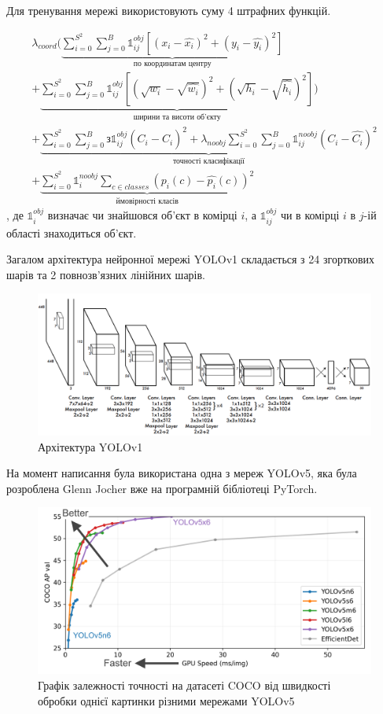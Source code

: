 Для тренування мережі використовують суму 4 штрафних функцій.

\begin{multline}
    \lambda_{coord}(
    \underbrace{ \sum_{i=0}^{S^2} \sum_{j=0}^{B}
    \mathbb{1}_{ij}^{obj} [(x_i - \widehat{x_i})^2 + (y_i - \widehat{y_i})^2]
    }_\textrm{по координатам центру}\\
    +
    \underbrace{
    \sum_{i=0}^{S^2} \sum_{j=0}^{B}
    \mathbb{1}_{ij}^{obj} [(\sqrt{w_i} - \sqrt{\widehat{w_i}})^2 + (\sqrt{h_i} - \sqrt{\widehat{h_i}})^2]
    }_\textrm{ширини та висоти об'єкту}
    )\\
    +  \underbrace{
        \sum_{i=0}^{S^2} \sum_{j=0}^{B} з
        \mathbb{1}_{ij}^{obj} (C_i - \widehat{C_i})^2
        +
        \lambda_{noobj} \sum_{i=0}^{S^2} \sum_{j=0}^{B} \mathbb{1}_{ij}^{noobj} (C_i - \widehat{C_i})^2
    }_\textrm{точності класифікації}\\
    +  \underbrace{
    \sum_{i=0}^{S^2} \mathbb{1}_{i}^{noobj}\sum_{c \in classes}(p_i(c) -  \widehat{p_i}(c))^2
    }_\textrm{ймовірності класів}
    \label{eq:cnn:yolo_loss}
\end{multline}
, де $\mathbb{1}_{i}^{obj}$ визначає чи знайшовся об'єкт в комірці $i$, а
$\mathbb{1}_{ij}^{obj}$ чи в комірці $i$ в $j$-ій області знаходиться об'єкт.

Загалом архітектура нейронної мережі YOLOv1 складається з 24 згорткових шарів та
2 повнозв'язних лінійних шарів.

\begin{figure}[H]
    \includegraphics[width=0.8\linewidth]{images/cnn_yolo2}
    \centering
    \caption{Архітектура YOLOv1 \cite{yolov1}
    }
\end{figure}

На момент написання була використана одна з мереж YOLOv5, яка була
розроблена Glenn Jocher вже на програмній бібліотеці PyTorch.

\begin{figure}[H]
    \includegraphics[width=0.5\linewidth]{images/cnn_yolo3}
    \centering
    \caption{Графік залежності точності на датасеті COCO від швидкості обробки однієї
        картинки різними мережами YOLOv5
    }
\end{figure}

